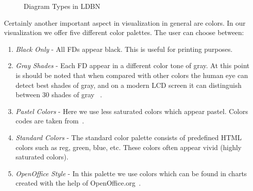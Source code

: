 \begin{figure}[ht]
  \centering
\caption{Diagram Types in LDBN}
\end{figure}

Certainly another important aspect in visualization in general are colors.
In our visualization we offer five different color palettes. The user can 
choose between:
\begin{enumerate}
	\item \emph{Black Only} - All FDs appear black. This is useful for printing
	purposes.
	\item \emph{Gray Shades} - Each FD appear in a different color tone of gray. 
	At this point is should be noted that when compared with other colors 
	the human eye can detect best shades of gray, and on a modern LCD screen it can
	distinguish between 30 shades of gray~\cite[Chapter 2]{bimg1} . 
	\item \emph{Pastel Colors} - Here we use less saturated colors which appear pastel. 
	Colors codes are taken from~\cite{wpastel}.
	\item \emph{Standard Colors} - The standard color palette consists of predefined
	HTML colors such as reg, green, blue, etc. These colors often appear vivid 
	(highly saturated colors).
	\item \emph{OpenOffice Style} - In this  palette we use colors which
	can be found in charts created with the help of OpenOffice.org~\cite{wooorg}. 
\end{enumerate}
 

